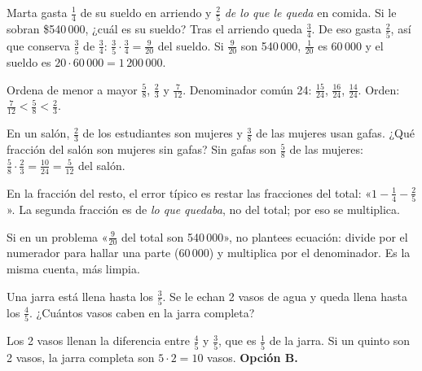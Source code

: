 \begin{ejemplo}
Marta gasta $\tfrac14$ de su sueldo en arriendo y $\tfrac25$ \emph{de lo que le queda} en comida. Si le sobran
\$540\,000, ¿cuál es su sueldo?
\solucion Tras el arriendo queda $\tfrac34$. De eso gasta $\tfrac25$, así que conserva $\tfrac35$ de $\tfrac34$:
$\tfrac35 \cdot \tfrac34 = \tfrac{9}{20}$ del sueldo. Si $\tfrac{9}{20}$ son 540\,000, $\tfrac{1}{20}$ es 60\,000 y el
sueldo es $20 \cdot 60\,000 = 1\,200\,000$.
\end{ejemplo}

\begin{ejemplo}
Ordena de menor a mayor $\tfrac58$, $\tfrac23$ y $\tfrac{7}{12}$.
\solucion Denominador común 24: $\tfrac{15}{24}$, $\tfrac{16}{24}$, $\tfrac{14}{24}$. Orden:
$\tfrac{7}{12} < \tfrac58 < \tfrac23$.
\end{ejemplo}

\begin{ejemplo}
En un salón, $\tfrac23$ de los estudiantes son mujeres y $\tfrac38$ de las mujeres usan gafas. ¿Qué fracción del salón son
mujeres sin gafas?
\solucion Sin gafas son $\tfrac58$ de las mujeres: $\tfrac58 \cdot \tfrac23 = \tfrac{10}{24} = \tfrac{5}{12}$ del salón.
\end{ejemplo}

\begin{trampa}
En la fracción del resto, el error típico es restar las fracciones del total: «$1 - \tfrac14 - \tfrac25$». La segunda
fracción es de \emph{lo que quedaba}, no del total; por eso se multiplica.
\end{trampa}

\begin{atajo}
Si en un problema «$\tfrac{9}{20}$ del total son 540\,000», no plantees ecuación: divide por el numerador para hallar una
parte ($60\,000$) y multiplica por el denominador. Es la misma cuenta, más limpia.
\end{atajo}

\begin{reto}
Una jarra está llena hasta los $\tfrac35$. Se le echan 2 vasos de agua y queda llena hasta los $\tfrac45$. ¿Cuántos vasos
caben en la jarra completa?
\end{reto}

\begin{retoresuelto}
Los 2 vasos llenan la diferencia entre $\tfrac45$ y $\tfrac35$, que es $\tfrac15$ de la jarra. Si un quinto son 2 vasos,
la jarra completa son $5 \cdot 2 = 10$ vasos. \textbf{Opción B.}
\end{retoresuelto}

